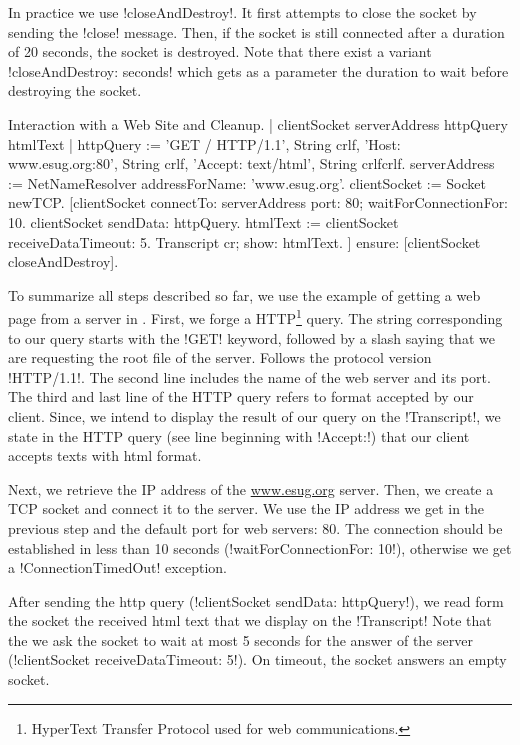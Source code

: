 \documentclass[a4paper,10pt,twoside]{book}
\begin{document}
In practice we use \ct!closeAndDestroy!. It first attempts to close the socket by sending the \ct!close! message.
Then, if the socket is still connected after a duration of 20 seconds, the socket is destroyed.
Note that there exist a variant \ct!closeAndDestroy: seconds! which gets as a parameter the duration to wait before destroying the socket.

\begin{script}{Interaction with a Web Site and Cleanup.}
| clientSocket serverAddress httpQuery htmlText |
httpQuery := 'GET / HTTP/1.1', String crlf, 
	'Host: www.esug.org:80', String crlf, 
	'Accept: text/html', String crlfcrlf.
serverAddress := NetNameResolver addressForName: 'www.esug.org'.
clientSocket := Socket newTCP.
[clientSocket 
	connectTo: serverAddress port: 80;
	waitForConnectionFor: 10.
 clientSocket sendData: httpQuery.
 htmlText  := clientSocket receiveDataTimeout: 5.
 Transcript cr; show: htmlText.
] ensure: [clientSocket closeAndDestroy].
\end{script}

To summarize all steps described so far, we use the example of getting a web page from a server in 
.
First, we forge a HTTP\footnote{HyperText Transfer Protocol used for web communications.} query.
The string corresponding to our query starts with the \ct!GET! keyword, followed by a slash saying that we are requesting the root file of the server.
Follows the protocol version \ct!HTTP/1.1!.
The second line includes the name of the web server and its port.
The third and last line of the HTTP query refers to format accepted by our client. 
Since, we intend to display the result of our query on the \ct!Transcript!, we state in the HTTP query (see line beginning with \ct!Accept:!) that our client accepts texts with html format.

Next, we retrieve the IP address of the \url{www.esug.org} server.
Then, we create a TCP socket and connect it to the server.
We use the IP address we get in the previous step and the default port for web servers: 80.
The connection should be established in less than 10 seconds (\ct!waitForConnectionFor: 10!), otherwise we get a \ct!ConnectionTimedOut! exception.

After sending the http query (\ct!clientSocket sendData: httpQuery!), we read form the socket the 
received html text that we display on the \ct!Transcript!
Note that the we ask the socket to wait at most 5 seconds for the answer of the server (\ct!clientSocket receiveDataTimeout: 5!).
On timeout, the socket answers an empty socket.
\end{document}
